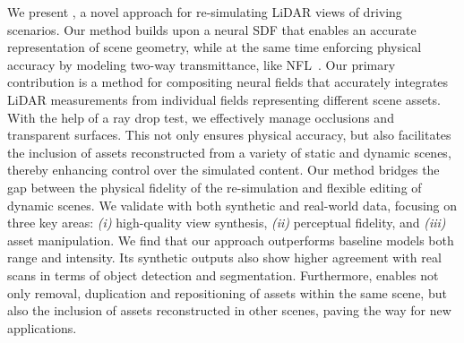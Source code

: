 We present \dynfl, a novel approach for re-simulating LiDAR views of driving scenarios. Our method builds upon a neural SDF that enables an accurate representation of scene geometry, while at the same time enforcing physical accuracy by modeling two-way transmittance, like NFL~\cite{Huang2023nfl}. 
%
Our primary contribution is a method for compositing neural fields that accurately integrates LiDAR measurements from individual fields representing different scene assets. With the help of a ray drop test, we effectively manage occlusions and transparent surfaces. This not only ensures physical accuracy, but also facilitates the inclusion of assets reconstructed from a variety of static and dynamic scenes, thereby enhancing control over the simulated content. Our method bridges the gap between the physical fidelity of the re-simulation and flexible editing of dynamic scenes.
%
We validate \dynfl with both synthetic and real-world data, focusing on three key areas: \textit{(i)} high-quality view synthesis, \textit{(ii)} perceptual fidelity, and \textit{(iii)} asset manipulation. We find that our approach outperforms baseline models \wrt both range and intensity. Its synthetic outputs also show higher agreement with real scans in terms of object detection and segmentation. Furthermore, \dynfl enables not only removal, duplication and repositioning of assets within the same scene, but also the inclusion of assets reconstructed in other scenes, paving the way for new applications.




